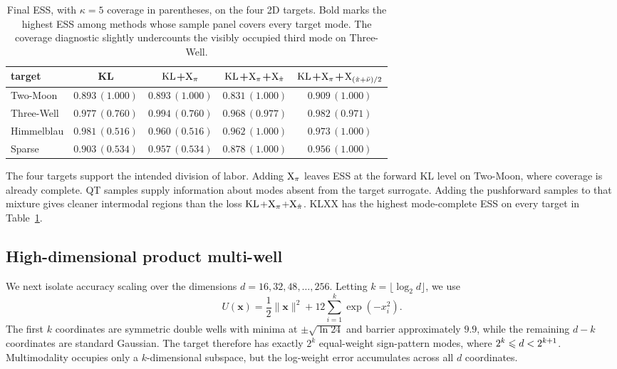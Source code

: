 \documentclass{article}
\begin{document}
\begin{table}[htb]
    \centering
    \begin{tabular}{lcccc}
        \toprule
        target & KL & $\mathrm{KL}$+$\mathrm{X}_\pi$ & $\mathrm{KL}$+$\mathrm{X}_\pi$+$\mathrm{X}_{\hat\pi}$ & $\mathrm{KL}$+$\mathrm{X}_\pi$+$\mathrm{X}_{(\hat\pi+\bar\nu)/2}$ \\
        \midrule
        Two-Moon   & $0.893\,(1.000)$ & $0.893\,(1.000)$ & $0.831\,(1.000)$ & $\mathbf{0.909}\,(1.000)$ \\
        Three-Well & $0.977\,(0.760)$ & $0.994\,(0.760)$ & $0.968\,(0.977)$ & $\mathbf{0.982}\,(0.971)$ \\
        Himmelblau & $0.981\,(0.516)$ & $0.960\,(0.516)$ & $0.962\,(1.000)$ & $\mathbf{0.973}\,(1.000)$ \\
        Sparse     & $0.903\,(0.534)$ & $0.957\,(0.534)$ & $0.878\,(1.000)$ & $\mathbf{0.956}\,(1.000)$ \\
        \bottomrule
    \end{tabular}
    \caption{Final ESS, with $\kappa=5$ coverage in parentheses, on the four 2D targets. Bold marks the highest ESS among methods whose sample panel covers every target mode. The coverage diagnostic slightly undercounts the visibly occupied third mode on Three-Well.}
    \label{tab: 2d-benchmark-summary}
\end{table}

The four targets support the intended division of labor. Adding $\mathrm{X}_\pi$ leaves ESS at the forward KL level on Two-Moon, where coverage is already complete. QT samples supply information about modes absent from the target surrogate. Adding the pushforward samples to that mixture gives cleaner intermodal regions than the loss $\mathrm{KL}$+$\mathrm{X}_\pi$+$\mathrm{X}_{\hat\pi}$. KLXX has the highest mode-complete ESS on every target in Table~\ref{tab: 2d-benchmark-summary}.

\subsection{High-dimensional product multi-well}
\label{subsec: highd}

We next isolate accuracy scaling over the dimensions
$d=16,32,48,\ldots,256$. Letting $k=\lfloor\log_2 d\rfloor$, we use
\begin{equation}
    U(\mathbf{x})=\frac12\lVert\mathbf{x}\rVert^2
    +12\sum_{i=1}^{k}\exp(-x_i^2).
    \label{eq: highd-potential}
\end{equation}
The first $k$ coordinates are symmetric double wells with minima at $\pm\sqrt{\ln 24}$ and barrier approximately $9.9$, while the remaining $d-k$ coordinates are standard Gaussian. The target therefore has exactly $2^k$ equal-weight sign-pattern modes, where $2^k\leqslant d<2^{k+1}$. Multimodality occupies only a $k$-dimensional subspace, but the log-weight error accumulates across all $d$ coordinates.
\end{document}
